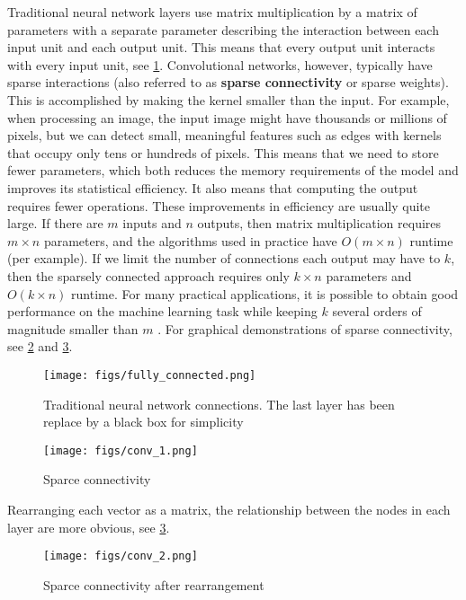 Traditional neural network layers use matrix multiplication by a matrix of parameters with a separate parameter describing the interaction between each input unit and each output unit. This means that every output unit interacts with every input unit, see \cref{fig:fully_connected}.
Convolutional networks, however, typically have sparse interactions (also referred to as \textbf{sparse connectivity} or sparse weights).
This is accomplished by making the kernel smaller than the input.
For example, when processing an image, the input image might have thousands or millions of pixels, but we can detect small, meaningful features such as edges with kernels that occupy only tens or hundreds of pixels. This means that we need to store
fewer parameters, which both reduces the memory requirements of the model and improves its statistical efficiency.
It also means that computing the output requires fewer operations. These improvements in efficiency are usually quite large.
If there are $m$ inputs and $n$ outputs, then matrix multiplication requires $m \times n$
parameters, and the algorithms used in practice have $O(m \times n)$ runtime (per example).
If we limit the number of connections each output may have to $k$, then the sparsely connected approach requires
only $k \times n$ parameters and $O(k \times n)$ runtime. For many practical applications, it is possible to obtain good performance
on the machine learning task while keeping $k$ several orders of magnitude smaller
than $m$ \cite{Ian16}. For graphical demonstrations of sparse connectivity, see \cref{fig:s_conv_1} and \cref{fig:s_conv_2}.

\begin{figure}[!htbp]
  \centering
  \texttt{[image: figs/fully\_connected.png]}
  \caption[Traditional neural network connections]{Traditional neural network connections. The last layer has been replace by a black box for simplicity}\label{fig:fully_connected}
\end{figure}

\begin{figure}[!htbp]
  \centering
  \texttt{[image: figs/conv\_1.png]}
  \caption{Sparce connectivity}\label{fig:s_conv_1}
\end{figure}

Rearranging each vector as a matrix, the relationship between the nodes in each layer are more obvious, see \cref{fig:s_conv_2}.


\begin{figure}[!htbp]
  \centering
  \texttt{[image: figs/conv\_2.png]}
  \caption{Sparce connectivity after rearrangement}\label{fig:s_conv_2}
\end{figure}

